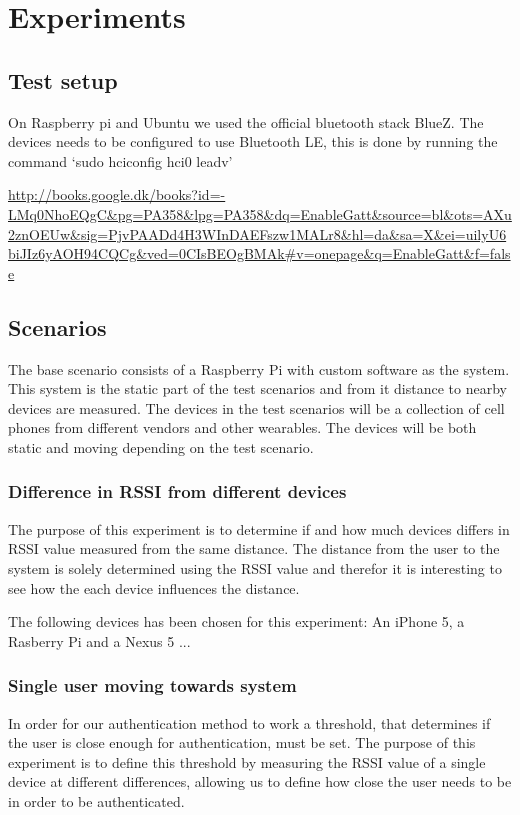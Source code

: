 \section{Experiments}

\subsection{Test setup}

On Raspberry pi and Ubuntu we used the official bluetooth stack BlueZ.
The devices needs to be configured to use Bluetooth LE, this is done by running the command ‘sudo hciconfig hci0 leadv’

\url{http://books.google.dk/books?id=-LMq0NhoEQgC&pg=PA358&lpg=PA358&dq=EnableGatt&source=bl&ots=AXu2znOEUw&sig=PjvPAADd4H3WInDAEFszw1MALr8&hl=da&sa=X&ei=uilyU6biJIz6yAOH94CQCg&ved=0CIsBEOgBMAk#v=onepage&q=EnableGatt&f=false}

\subsection{Scenarios}

The base scenario consists of a Raspberry Pi with custom software as the system.
This system is the static part of the test scenarios and from it distance to nearby devices are measured.
The devices in the test scenarios will be a collection of cell phones from different vendors and other wearables.
The devices will be both static and moving depending on the test scenario.


\subsubsection{Difference in RSSI from different devices}
The purpose of this experiment is to determine if and how much devices differs in RSSI value measured from the same distance. The distance from the user to the system is solely determined using the RSSI value and therefor it is interesting to see how the each device influences the distance.
	
The following devices has been chosen for this experiment: An iPhone 5, a Rasberry Pi and a Nexus 5 ... 

\subsubsection{Single user moving towards system}
\label{section:MovingTowardsSystem}
In order for our authentication method to work a threshold, that determines if the user is close enough for authentication, must be set. The purpose of this experiment is to define this threshold by measuring the RSSI value of a single device at different differences, allowing us to define how close the user needs to be in order to be authenticated. 


